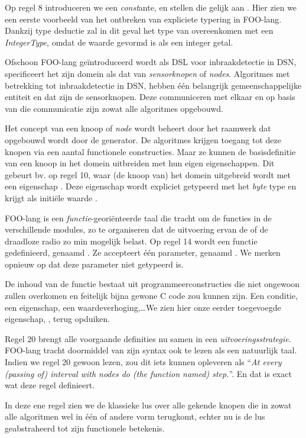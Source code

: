 Op regel 8 introduceren we een \emph{const}ante,  en stellen die
gelijk aan . Hier zien we een eerste voorbeeld van het ontbreken van
expliciete typering in FOO-lang. Dankzij type deductie zal in dit geval het
type van  overeenkomen met een \emph{IntegerType}, omdat de
waarde  gevormd is als een integer getal.

Ofschoon FOO-lang ge\"introduceerd wordt als DSL voor inbraakdetectie in DSN,
specificeert het zijn domein als dat van \emph{sensorknopen} of \emph{nodes}.
Algoritmes met betrekking tot inbraakdetectie in DSN, hebben \'e\'en belangrijk
gemeenschappelijke entiteit en dat zijn de sensorknopen. Deze communiceren met
elkaar en op basis van die communicatie zijn zowat alle algoritmes opgebouwd.

Het concept van een knoop of \emph{node} wordt beheert door het raamwerk dat
opgebouwd wordt door de generator. De algoritmes krijgen toegang tot deze
knopen via een aantal functionele constructies. Maar ze kunnen de
basisdefinitie van een knoop in het domein uitbreiden met hun eigen
eigenschappen. Dit gebeurt bv. op regel 10, waar (de knoop van) het domein
uitgebreid wordt met een eigenschap . Deze eigenschap wordt
expliciet getypeerd met het \emph{byte} type en krijgt als initi\"ele waarde
.

FOO-lang is een \emph{functie}-geori\"enteerde taal die tracht om de functies
in de verschillende modules, zo te organiseren dat de uitvoering ervan de \mcu
of de draadloze radio zo min mogelijk belast. Op regel 14 wordt een functie
gedefinieerd, genaamd . Ze accepteert \'e\'en parameter, genaamd
. We merken opnieuw op dat deze parameter niet getypeerd is.

De inhoud van de functie bestaat uit programmeerconstructies die niet ongewoon
zullen overkomen en feitelijk bijna gewone C code zou kunnen zijn. Een
conditie, een eigenschap, een waardeverhoging,\dots We zien hier onze eerder
toegevoegde eigenschap, , terug opduiken.

Regel 20 brengt alle voorgaande definities nu samen in een
\emph{uitvoeringsstrategie}. FOO-lang tracht doormiddel van zijn syntax ook te
lezen als een natuurlijk taal. Indien we regel 20 gewoon lezen, zou dit iets
kunnen opleveren als ``\emph{At every (passing of) interval with nodes do (the
function named) step.}''. En dat is exact wat deze regel definieert.

In deze ene regel zien we de klassieke lus over alle gekende knopen die in
zowat alle algoritmen wel in \'e\'en of andere vorm terugkomt, echter nu is de
lus geabstraheerd tot zijn functionele betekenis.

